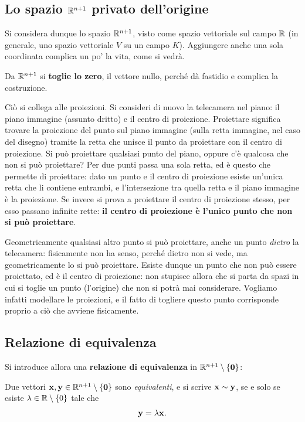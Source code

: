 \subsection{Lo spazio $\mathbb{R}^{n+1}$ privato dell'origine}

Si considera dunque lo spazio $\mathbb{R}^{n+1}$, visto come spazio vettoriale sul campo $\mathbb{R}$ (in generale, uno spazio vettoriale $V$ su un campo $K$). Aggiungere anche una sola coordinata complica un po' la vita, come si vedrà.

Da $\mathbb{R}^{n+1}$ si \textbf{toglie lo zero}, il vettore nullo, perché dà fastidio e complica la costruzione.

Ciò si collega alle proiezioni. Si consideri di nuovo la telecamera nel piano: il piano immagine (assunto dritto) e il centro di proiezione. Proiettare significa trovare la proiezione del punto sul piano immagine (sulla retta immagine, nel caso del disegno) tramite la retta che unisce il punto da proiettare con il centro di proiezione. Si può proiettare qualsiasi punto del piano, oppure c'è qualcosa che non si può proiettare? Per due punti passa una sola retta, ed è questo che permette di proiettare: dato un punto e il centro di proiezione esiste un'unica retta che li contiene entrambi, e l'intersezione tra quella retta e il piano immagine è la proiezione. Se invece si prova a proiettare il centro di proiezione stesso, per esso passano infinite rette: \textbf{il centro di proiezione è l'unico punto che non si può proiettare}.

Geometricamente qualsiasi altro punto si può proiettare, anche un punto \emph{dietro} la telecamera: fisicamente non ha senso, perché dietro non si vede, ma geometricamente lo si può proiettare. Esiste dunque un punto che non può essere proiettato, ed è il centro di proiezione: non stupisce allora che si parta da spazi in cui si toglie un punto (l'origine) che non si potrà mai considerare. Vogliamo infatti modellare le proiezioni, e il fatto di togliere questo punto corrisponde proprio a ciò che avviene fisicamente.

\subsection{Relazione di equivalenza}

Si introduce allora una \textbf{relazione di equivalenza} in $\mathbb{R}^{n+1}\setminus\{\mathbf{0}\}$:

\begin{definition}
Due vettori $\mathbf{x},\mathbf{y}\in\mathbb{R}^{n+1}\setminus\{\mathbf{0}\}$ sono \emph{equivalenti}, e si scrive $\mathbf{x}\sim\mathbf{y}$, se e solo se esiste $\lambda\in\mathbb{R}\setminus\{0\}$ tale che
\[
  \mathbf{y} = \lambda\mathbf{x} .
\]
\end{definition}

